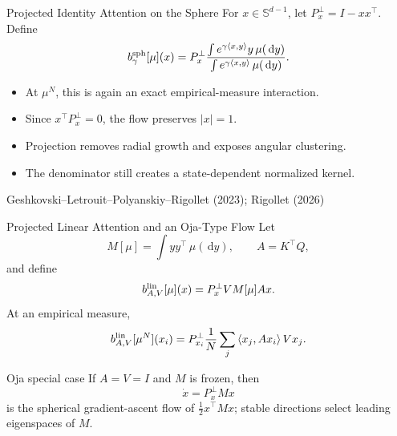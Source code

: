 \documentclass[aspectratio=169,11pt]{beamer}
\newcommand{\dd}{\,\mathrm{d}}
\newcommand{\abs}[1]{\left\lvert#1\right\rvert}
\newcommand{\ip}[2]{\left\langle#1,#2\right\rangle}
\newcommand{\blue}[1]{{\color{blue}#1}}
\newcommand{\onslidecite}[1]{\par\vspace{0.4ex}\hfill{\scriptsize\color{black!60}#1}}
\begin{document}
\begin{frame}{Projected Identity Attention on the Sphere}
For $x\in\mathbb S^{d-1}$, let $P_x^\perp=I-xx^\top$.  Define
\[
 b_\gamma^{\rm sph}[\mu](x)
 =P_x^\perp
   \frac{\int e^{\gamma\ip{x}{y}}y\,\mu(\dd y)}
        {\int e^{\gamma\ip{x}{y}}\,\mu(\dd y)}.
\]

\begin{itemize}
\item At $\mu^N$, this is again an exact empirical-measure interaction.
\item Since $x^\top P_x^\perp=0$, the flow preserves $\abs{x}=1$.
\item Projection removes radial growth and exposes angular clustering.
\item The denominator still creates a state-dependent normalized kernel.
\end{itemize}

\onslidecite{Geshkovski--Letrouit--Polyanskiy--Rigollet (2023); Rigollet (2026)}
\end{frame}

\begin{frame}{Projected Linear Attention and an Oja-Type Flow}
\small
Let
\[
 M[\mu]=\int yy^\top\,\mu(\dd y),
 \qquad A=K^\top Q,
\]
and define
\[
 b_{A,V}^{\rm lin}[\mu](x)=P_x^\perp V M[\mu]Ax.
\]
At an empirical measure,
\[
 b_{A,V}^{\rm lin}[\mu^N](x_i)
 =P_{x_i}^\perp\frac1N\sum_j
   \ip{x_j}{Ax_i}Vx_j.
\]

\begin{exampleblock}{Oja special case}
If $A=V=I$ and $M$ is frozen, then
\[
 \dot x=P_x^\perp Mx
\]
is the spherical gradient-ascent flow of $\tfrac12 x^\top Mx$; stable directions select leading eigenspaces of $M$.
\end{exampleblock}

\end{frame}
\end{document}
